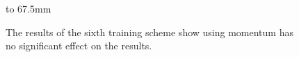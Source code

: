\begin{figure}[p]
    \hbox to 67.5mm{}
    \caption[The results of the sixth training scheme]{The results of the sixth training scheme show using momentum has no significant effect on the results.}
    \label{fig:training_scheme_6}
\end{figure}

